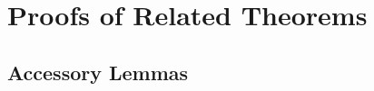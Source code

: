 \documentclass[a4paper,USenglish]{tex/lipics-v2016}
\begin{document}










\section{Proofs of Related Theorems}

\subsection{Accessory Lemmas}
\end{document}
